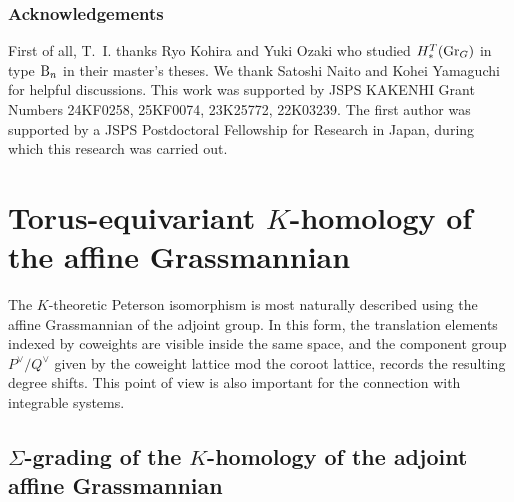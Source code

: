 \documentclass[a4paper]{amsart}
\theoremstyle{remark}
\numberwithin{equation}{section}
\begin{document}
\subsubsection*{Acknowledgements}
First of all, T.~I. thanks Ryo Kohira and Yuki Ozaki
who studied  $H_{*}^T(\mathrm{Gr}_G)$ in type $\mathrm{B}_{n}$ in their master’s theses.
We thank Satoshi Naito and Kohei Yamaguchi for helpful discussions. This work was supported by JSPS KAKENHI Grant Numbers
24KF0258, 25KF0074, %
23K25772, 22K03239. %
The first author was supported by a JSPS Postdoctoral Fellowship for Research in Japan, during which this research was carried out.




\section{Torus-equivariant $K$-homology of the affine Grassmannian}\label{sec_alg_cons}
The \(K\)-theoretic Peterson isomorphism is most naturally described
using the affine Grassmannian of the adjoint group.  In this form, the
translation elements indexed by coweights are visible inside the same
space, and the component group \(P^\lor/Q^\lor\) given by the coweight lattice
mod the coroot lattice, records the resulting
degree shifts.  This point of view is also important for the connection
with integrable systems.


\subsection{$\Sigma$-grading of the $K$-homology of the adjoint affine Grassmannian}
\end{document}
